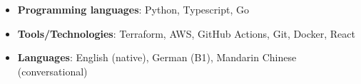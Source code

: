 \documentclass[letterpaper,hidelinks,11pt]{article}
\newcommand{\resumeItem}[2]{
  \item\small{
    \textbf{#1}{: #2 \vspace{-2pt}}
  }
}
\newcommand{\resumeSubItem}[2]{\resumeItem{#1}{#2}\vspace{-4pt}}
\newcommand{\resumeSubHeadingListStart}{\begin{itemize}[leftmargin=*]}
\newcommand{\resumeSubHeadingListEnd}{\end{itemize}}
\begin{document}
\resumeSubHeadingListStart
	\resumeSubItem{Programming languages}{Python, Typescript, Go}
	\resumeSubItem{Tools/Technologies}
	{Terraform, AWS, GitHub Actions, Git, Docker, React}
   \resumeSubItem{Languages}{English (native), German (B1), Mandarin Chinese
   (conversational)}
\resumeSubHeadingListEnd






\end{document}
